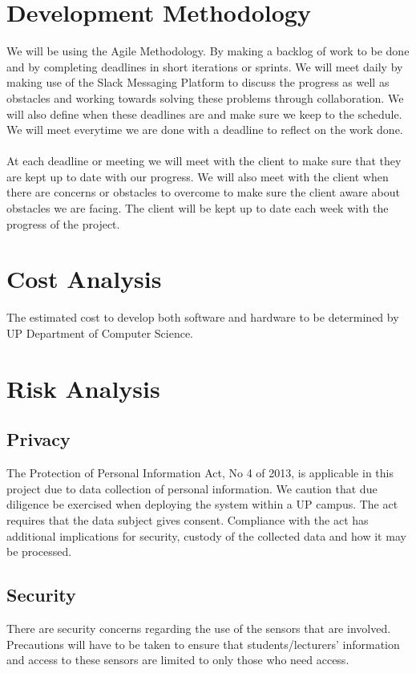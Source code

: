 \documentclass{article}
\begin{document}
\newpage
\section{Development Methodology}
We will be using the Agile Methodology. By making a backlog of work to be done and by completing deadlines in short iterations or sprints. We will meet daily by making use of the Slack Messaging Platform to discuss the progress as well as obstacles and working towards solving these problems through collaboration. We will also define when these deadlines are and make sure we keep to the schedule. We will meet everytime we are done with a deadline to reflect on the work done. \\ \\
At each deadline or meeting we will meet with the client to make sure that they are kept up to date with our progress. We will also meet with the client when there are concerns or obstacles to overcome to make sure the client aware about obstacles we are facing. The client will be kept up to date each week with the progress of the project.


\section{Cost Analysis}
The estimated cost to develop both software and hardware to be determined by UP Department of Computer Science.

\section{Risk Analysis}
\subsection{Privacy}
The Protection of Personal Information Act, No 4 of 2013, is applicable in this project due to data collection of personal information. We caution that due diligence be exercised when deploying the system within a UP campus. The act requires that the data subject gives consent. Compliance with the act has additional implications for security, custody of the collected data and how it may be processed.

\subsection{Security}
There are security concerns regarding the use of  the sensors that are involved. Precautions will have to be taken to ensure that students/lecturers' information and access to these sensors are limited to only those who need access.
\end{document}
